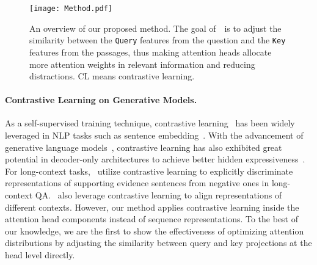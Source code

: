 
\begin{figure*}[th]
    \centering
    \texttt{[image: Method.pdf]}
    \caption{An overview of our proposed method. The goal of~\method~is to adjust the similarity between the \texttt{Query} features from the question and the \texttt{Key} features from the passages, thus making attention heads allocate more attention weights in relevant information and reducing distractions. CL means contrastive learning.}
    \label{fig:overview}
\end{figure*}


\paragraph{Contrastive Learning on Generative Models.} As a self-supervised training technique, contrastive learning~\citep{chopra2005learning, hadsell2006dimensionality, robinson2021contrastive} has been widely leveraged in NLP tasks such as sentence embedding~\citep{gao2021simcse,li2023multi,zhang2022fine}. With the advancement of generative language models~\citep{radford2019language}, contrastive learning has also exhibited great potential in decoder-only architectures to achieve better hidden expressiveness~\citep{su2022a, jain-etal-2023-contraclm, yan2024contrastive}. For long-context tasks,~\citet{caciularu-etal-2022-long} utilize contrastive learning to explicitly discriminate representations of supporting evidence sentences from negative ones in long-context QA.~\citet{wu2024reducing} also leverage contrastive learning to align representations of different contexts. However, our method applies contrastive learning inside the attention head components instead of sequence representations. To the best of our knowledge, we are the first to show the effectiveness of optimizing attention distributions by adjusting the similarity between query and key projections at the head level directly.